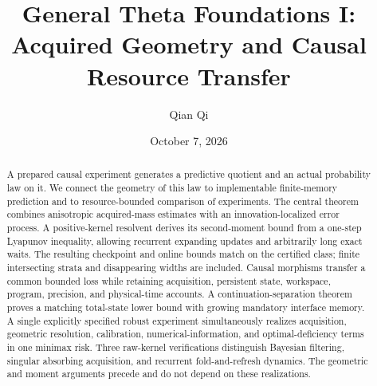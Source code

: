 \documentclass[11pt]{amsart}
\title[Acquired geometry and causal resource transfer]{General Theta Foundations I:\\Acquired Geometry and Causal Resource Transfer}
\author{Qian Qi}
\date{October 7, 2026}
\theoremstyle{definition}
\begin{document}
\begin{abstract}
A prepared causal experiment generates a predictive quotient and an actual probability law on it. We connect the geometry of this law to implementable finite-memory prediction and to resource-bounded comparison of experiments. The central theorem combines anisotropic acquired-mass estimates with an innovation-localized error process. A positive-kernel resolvent derives its second-moment bound from a one-step Lyapunov inequality, allowing recurrent expanding updates and arbitrarily long exact waits. The resulting checkpoint and online bounds match on the certified class; finite intersecting strata and disappearing widths are included. Causal morphisms transfer a common bounded loss while retaining acquisition, persistent state, workspace, program, precision, and physical-time accounts. A continuation-separation theorem proves a matching total-state lower bound with growing mandatory interface memory. A single explicitly specified robust experiment simultaneously realizes acquisition, geometric resolution, calibration, numerical-information, and optimal-deficiency terms in one minimax risk. Three raw-kernel verifications distinguish Bayesian filtering, singular absorbing acquisition, and recurrent fold-and-refresh dynamics. The geometric and moment arguments precede and do not depend on these realizations.
\end{abstract}
\maketitle








\appendix

\clearpage

\end{document}
